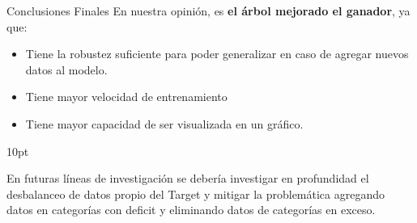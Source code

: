 \documentclass[pdf]{beamer}
\def\vspace{}%
\begin{document}
{\begin{frame}{Conclusiones Finales}
    En nuestra opinión, es \textbf{el árbol mejorado el ganador}, ya que:
    \begin{itemize}
        \item Tiene la robustez suficiente para poder generalizar en caso de agregar nuevos datos al modelo. 
        \item Tiene mayor velocidad de entrenamiento 
        \item Tiene mayor capacidad de ser visualizada en un gráfico.
    \end{itemize}
    \vspace{10pt} 

    En futuras líneas de investigación se debería investigar en profundidad el desbalanceo de datos propio del Target y mitigar la problemática agregando datos en categorías con deficit y eliminando datos de categorías en exceso.

\end{frame}
}
\end{document}
